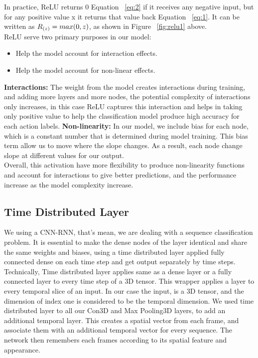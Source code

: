 In practice, ReLU returns 0 Equation ~\ref{eq:2} if it receives any negative input, but for any positive value x it returns that value back Equation ~\ref{eq:1}. It can be written as $\large R_{(z)}=max(0,z)$, as shown in Figure ~\ref{fig:relu1} above.\\

ReLU serve two primary purposes in our model:
\begin{itemize}
    \item Help the model account for interaction effects.
    \item Help the model account for non-linear effects.
\end{itemize}
\textbf{Interactions:} The weight from the model creates interactions during training, and adding more layers and more nodes, the potential complexity of interactions only increases, in this case ReLU captures this interaction and helps in taking only positive value to help the classification model produce high accuracy for each action labels.
\textbf{Non-linearity:} In our model, we include bias for each node, which is a constant number that is determined during model training. This bias term allow us to move where the slope changes. As a result, each node change slope at different values for our output.\\

Overall, this activation have more flexibility to produce non-linearity functions and account for interactions to give better predictions, and the performance increase as the model complexity increase.

\subsection{Time Distributed Layer}
We using a CNN-RNN, that's mean, we are dealing with a sequence classification problem. It is essential to make the dense nodes of the layer identical and share the same weights and biases, using a time distributed layer applied fully connected dense on each time step and get output separately by time steps.\\

Technically, Time distributed layer applies same as a dense layer or a fully connected layer to every time step of a 3D tensor. This wrapper applies a layer to every temporal slice of an input. In our case the input, is a 3D tensor, and the dimension of index one is considered to be the temporal dimension. We used time distributed layer to all our Con3D and Max Pooling3D layers, to add an additional temporal layer. This creates a spatial vector from each frame, and associate them with an additional temporal vector for every sequence. The network then remembers each frames according to its spatial feature and appearance.

